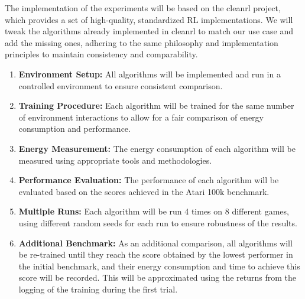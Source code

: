 
The implementation of the experiments will be based on the cleanrl project, which provides a set of high-quality, standardized RL implementations. We will tweak the algorithms already implemented in cleanrl to match our use case and add the missing ones, adhering to the same philosophy and implementation principles to maintain consistency and comparability.

\begin{enumerate}
	\item \textbf{Environment Setup:} All algorithms will be implemented and run in a controlled environment to ensure consistent comparison.
	\item \textbf{Training Procedure:} Each algorithm will be trained for the same number of environment interactions to allow for a fair comparison of energy consumption and performance.
	\item \textbf{Energy Measurement:} The energy consumption of each algorithm will be measured using appropriate tools and methodologies.
	\item \textbf{Performance Evaluation:} The performance of each algorithm will be evaluated based on the scores achieved in the Atari 100k benchmark.
	\item \textbf{Multiple Runs:} Each algorithm will be run 4 times on 8 different games, using different random seeds for each run to ensure robustness of the results.
	\item \textbf{Additional Benchmark:} As an additional comparison, all algorithms will be re-trained until they reach the score obtained by the lowest performer in the initial benchmark, and their energy consumption and time to achieve this score will be recorded. This will be approximated using the returns from the logging of the training during the first trial.
\end{enumerate}

